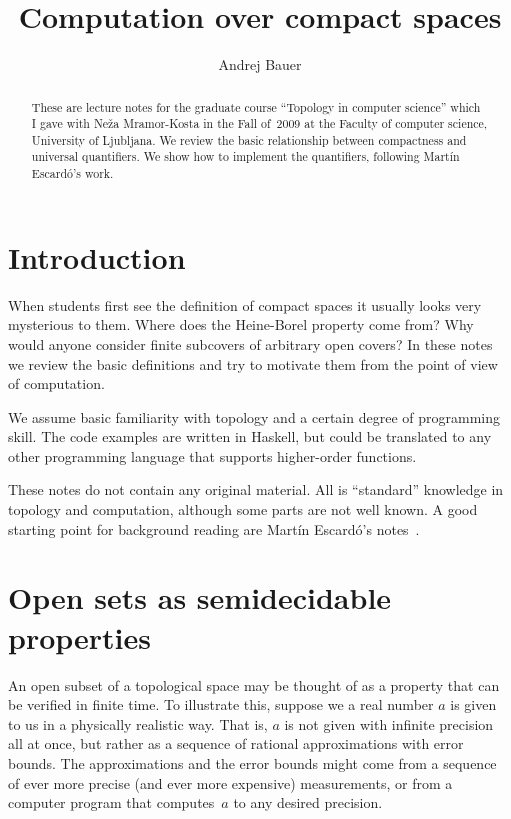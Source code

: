 \documentclass[a4paper,10pt]{article}
\begin{document}
\title{Computation over compact spaces}
\author{Andrej Bauer}

\maketitle

\begin{abstract}
  These are lecture notes for the graduate course ``Topology in
  computer science'' which I gave with Neža Mramor-Kosta in the Fall
  of~2009 at the Faculty of computer science, University of Ljubljana.
  We review the basic relationship between compactness and universal
  quantifiers. We show how to implement the quantifiers, following
  Martín Escardó's work.
\end{abstract}

\section{Introduction}
\label{sec:introduction}

When students first see the definition of compact spaces it usually
looks very mysterious to them. Where does the Heine-Borel property
come from? Why would anyone consider finite subcovers of arbitrary
open covers? In these notes we review the basic definitions and try to
motivate them from the point of view of computation.

We assume basic familiarity with topology and a certain degree of
programming skill. The code examples are written in Haskell, but could
be translated to any other programming language that supports
higher-order functions.

These notes do not contain any original material. All is ``standard''
knowledge in topology and computation, although some parts are not
well known. A good starting point for background reading are Martín
Escardó's notes~\cite{escardo}.

\section{Open sets as semidecidable properties}
\label{sec:opens-semidecidable}

An open subset of a topological space may be thought of as a property
that can be verified in finite time. To illustrate this, suppose we a
real number $a$ is given to us in a physically realistic way. That is,
$a$ is not given with infinite precision all at once, but rather as a
sequence of rational approximations with error bounds. The
approximations and the error bounds might come from a sequence of ever
more precise (and ever more expensive) measurements, or from a
computer program that computes~$a$ to any desired precision.
\end{document}
